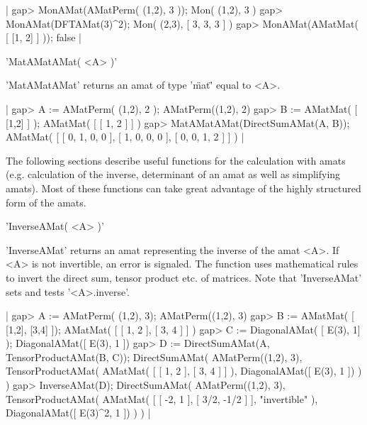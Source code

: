 |    gap> MonAMat(AMatPerm( (1,2), 3 ));
    Mon( (1,2), 3 )
    gap> MonAMat(DFTAMat(3)^2);
    Mon(
      (2,3),
      [ 3, 3, 3 ]
    )
    gap> MonAMat(AMatMat( [ [1, 2] ] ));
    false |


'MatAMatAMat( <A> )'

'MatAMatAMat' returns an amat of type '\"mat\"' equal to <A>.

|    gap> A := AMatPerm( (1,2), 2 );
    AMatPerm((1,2), 2)
    gap> B := AMatMat( [ [1,2] ] );
    AMatMat(
      [ [ 1, 2 ] ]
    )
    gap> MatAMatAMat(DirectSumAMat(A, B));
    AMatMat(
      [ [ 0, 1, 0, 0 ], [ 1, 0, 0, 0 ], [ 0, 0, 1, 2 ] ]
    ) |


The following sections describe useful functions for the calculation
with amats (e.g. calculation of the inverse, determinant of an amat 
as well as simplifying amats).
Most of these functions can take great advantage of the highly structured
form of the amats.


'InverseAMat( <A> )'

'InverseAMat' returns an amat representing the inverse of the amat <A>.
If <A> is not invertible, an error is signaled. The function uses 
mathematical rules to invert the direct sum, tensor product etc. of 
matrices. Note that 'InverseAMat' sets and tests '<A>.inverse'.

|    gap> A := AMatPerm( (1,2), 3);                   
    AMatPerm((1,2), 3)
    gap> B := AMatMat( [ [1,2], [3,4] ]);
    AMatMat(
      [ [ 1, 2 ], [ 3, 4 ] ]
    )
    gap> C := DiagonalAMat( [ E(3), 1] );
    DiagonalAMat([ E(3), 1 ])
    gap> D := DirectSumAMat(A, TensorProductAMat(B, C));
    DirectSumAMat(
      AMatPerm((1,2), 3),
      TensorProductAMat(
        AMatMat( [ [ 1, 2 ], [ 3, 4 ] ] ),
        DiagonalAMat([ E(3), 1 ])
      )
    )
    gap> InverseAMat(D);
    DirectSumAMat(
      AMatPerm((1,2), 3),
      TensorProductAMat(
        AMatMat(
          [ [ -2, 1 ], [ 3/2, -1/2 ] ],
          "invertible"
        ),
        DiagonalAMat([ E(3)^2, 1 ])
      )
    ) |


